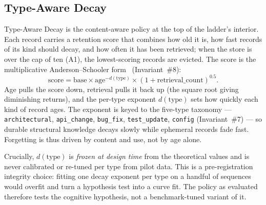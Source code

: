 
\subsection{Type-Aware Decay}
\label{sec:type-decay}

Type-Aware Decay is the content-aware policy at the top of the ladder's interior. Each
record carries a retention score that combines how old it is, how fast records of its kind
should decay, and how often it has been retrieved; when the store is over the cap of ten
(A1), the lowest-scoring records are evicted. The score is the multiplicative
Anderson--Schooler form~\cite{anderson1991} (Invariant~\#8):
\begin{equation}
  \label{eq:type-decay}
  \mathrm{score} = \mathrm{base}\times\mathrm{age}^{-d(\mathrm{type})}
  \times(1+\mathrm{retrieval\_count})^{0.5}.
\end{equation}
Age pulls the score down, retrieval pulls it back up (the square root giving diminishing
returns), and the per-type exponent $d(\mathrm{type})$ sets how quickly each kind of record
ages. The exponent is keyed to the five-type taxonomy --- \texttt{architectural},
\texttt{api\_change}, \texttt{bug\_fix}, \texttt{test\_update}, \texttt{config}
(Invariant~\#7) --- so durable structural knowledge decays slowly while ephemeral records
fade fast. Forgetting is thus driven by content and use, not by age alone.

Crucially, $d(\mathrm{type})$ is \emph{frozen at design time} from the theoretical values
and is never calibrated or re-tuned per type from pilot data. This is a pre-registration
integrity choice: fitting one decay exponent per type on a handful of sequences would
overfit and turn a hypothesis test into a curve fit. The policy as evaluated therefore
tests the cognitive hypothesis, not a benchmark-tuned variant of it.
